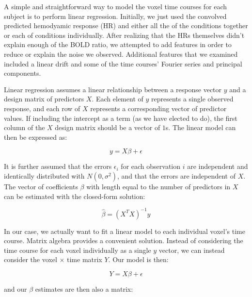 
\par \indent A simple and straightforward way to model the voxel time courses 
for each subject is to perform linear regression. Initially, we just used the 
convolved predicted hemodyamic response (HR) and either all the of the 
conditions together or each of conditions individually. After realizing that 
the HRs themselves didn't explain enough of the BOLD ratio, we attempted to 
add features in order to reduce or explain the noise we observed. Additional 
features that we examined included a linear drift and some of the time 
courses' Fourier series and principal components.

\par Linear regression assumes a linear relationship between a response 
vector $y$ and a design matrix of predictors $X$. Each element of $y$ 
represents a single observed response, and each row of $X$ represents a 
corresponding vector of predictor values. If including the intercept as a 
term (as we have elected to do), the first column of the $X$ design matrix 
should be a vector of $1$s. The linear model can then be expressed as: 

\begin{equation}
y = X\beta + \epsilon
\end{equation}

\par It is further assumed that the errors $\epsilon_i$ for each observation 
$i$ are independent and identically distributed with $N(0, \sigma^2)$, and 
that the errors are independent of $X$. The vector of coefficients $\beta$ 
with length equal to the number of predictors in $X$ can be estimated with 
the closed-form solution:

\begin{equation}
\hat{\beta} =(X^T X)^{-1} y
\end{equation}

\par In our case, we actually want to fit a linear model to each individual 
voxel's time course. Matrix algebra provides a convenient solution. Instead of 
considering the time course for each voxel individually as a single $y$ 
vector, we can instead consider the voxel $\times$ time matrix $Y$. Our model 
is then:

\begin{equation}
Y = X\beta + \epsilon
\end{equation}

and our $\beta$ estimates are then also a matrix: 

